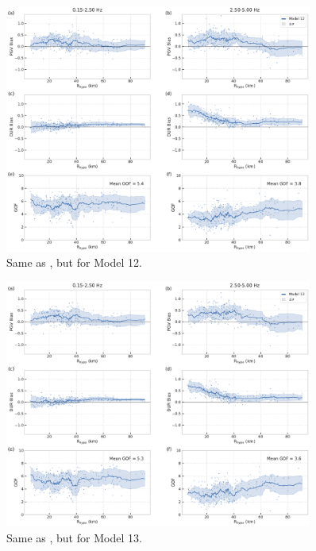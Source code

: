 \begin{figure}[!ht]
  \centering
  \includegraphics[width=0.9\textwidth,height=0.9\textheight,keepaspectratio]{figures/figure_highf_S22.pdf}
  \caption{Same as , but for Model 12.
  }
\label{fig:highf-S22}
\end{figure}
\clearpage


\begin{figure}[!ht]
  \centering
  \includegraphics[width=0.9\textwidth,height=0.9\textheight,keepaspectratio]{figures/figure_highf_S23.pdf}
  \caption{Same as , but for Model 13.
  }
\label{fig:highf-S23}
\end{figure}
\clearpage


